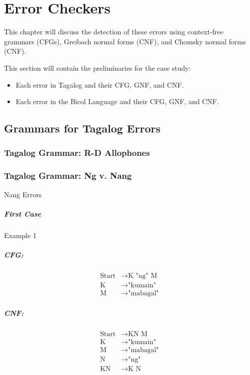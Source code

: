 \chapter{Error Checkers}
This chapter will discuss the detection of these errors using context-free grammars (CFGs), Greibach normal forms (CNF), and Chomsky normal forms (CNF).

{\color{blue}
This section will contain the preliminaries for the case study:

\begin{itemize}
    \item Each error in Tagalog and their CFG, GNF, and CNF.
    \item Each error in the Bicol Language and their CFG, GNF, and CNF.
\end{itemize}
}

\section{Grammars for Tagalog Errors}
\subsection{Tagalog Grammar: R-D Allophones}
\subsection{Tagalog Grammar: Ng v. Nang}

Nang Errors

\paragraph{First Case}
Example 1
\paragraph{CFG:}
\begin{equation*}
    \begin{aligned}
        \text{Start}   & \rightarrow \text{K "ng" M}   \\
        \text{K} & \rightarrow \text{"kumain"}   \\
        \text{M} & \rightarrow \text{"mabagal"}
    \end{aligned}
\end{equation*}

\paragraph{CNF:}
\begin{equation*}
    \begin{aligned}
        \text{Start}   & \rightarrow \text{KN M}   \\
        \text{K} & \rightarrow \text{"kumain"}   \\
        \text{M} & \rightarrow \text{"mabagal"} \\
        \text{N} & \rightarrow \text{"ng"} \\
        \text{KN} & \rightarrow \text{K N}
    \end{aligned}
\end{equation*}

